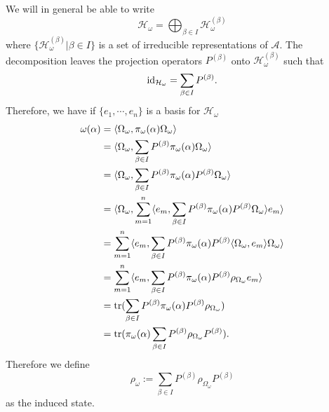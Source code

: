 We will in general be able to write
\begin{equation}
\mathcal{H}_\omega = \bigoplus_{\beta\in I}\mathcal{H}_\omega^{(\beta)}
\end{equation}
where $\{\mathcal{H}_\omega^{(\beta)}|\beta\in I\}$ is a set of irreducible representations of $\mathcal{A}$\cite{Bratteli1997}. The decomposition leaves the projection operators $P^{(\beta)}$ onto $\mathcal{H}_\omega^{(\beta)}$ such that
\begin{equation}
\operatorname{id}_{\mathcal{H}_\omega}=\sum_{\beta\in I}P^{(\beta)}.
\end{equation}
Therefore, we have if $\{e_1,\cdots,e_n\}$ is a basis for $\mathcal{H}_\omega$
\begin{align}
\begin{split}
\omega(\alpha)&=\langle \Omega_\omega, \pi_\omega(\alpha)\Omega_\omega\rangle \\
&=\langle\Omega_\omega,\sum_{\beta\in I}P^{(\beta)}\pi_\omega(\alpha)\Omega_\omega\rangle \\
&=\langle\Omega_\omega,\sum_{\beta\in I}P^{(\beta)}\pi_\omega(\alpha)P^{(\beta)}\Omega_\omega\rangle \\
&=\langle\Omega_\omega,\sum_{m=1}^n\langle e_m,\sum_{\beta\in I}P^{(\beta)}\pi_\omega(\alpha) P^{(\beta)}\Omega_\omega\rangle e_m\rangle \\
&=\sum_{m=1}^n\langle e_m,\sum_{\beta\in I}P^{(\beta)}\pi_\omega(\alpha) P^{(\beta)}\langle\Omega_\omega, e_m\rangle\Omega_\omega\rangle \\
&=\sum_{m=1}^n\langle e_m,\sum_{\beta\in I}P^{(\beta)}\pi_\omega(\alpha) P^{(\beta)}\rho_{\Omega_\omega} e_m\rangle \\
&=\operatorname{tr}(\sum_{\beta\in I}P^{(\beta)}\pi_\omega(\alpha) P^{(\beta)}\rho_{\Omega_\omega})\\
&=\operatorname{tr}(\pi_\omega(\alpha)\sum_{\beta\in I}P^{(\beta)}\rho_{\Omega_\omega} P^{(\beta)}).
\end{split}
\end{align}
Therefore we define
\begin{equation}\label{eq:entropy}
\rho_\omega := \sum_{\beta\in I}P^{(\beta)}\rho_{\Omega_\omega} P^{(\beta)}
\end{equation}
as the induced state.

